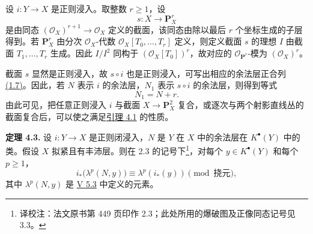 设 \(i:Y\to X\) 是正则浸入。取整数 \(r\ge1\)，设
\[
  s:X\longrightarrow \mathbf P_X^r
\]
是由同态 \((\mathcal O_X)^{r+1}\to\mathcal O_X\) 定义的截面，该同态由除以最后 \(r\) 个坐标生成的子层得到。若 \(\mathbf P_X^r\) 由分次 \(\mathcal O_X\)-代数 \(\mathcal O_X[T_0,\ldots,T_r]\) 定义，则定义截面 \(s\) 的理想 \(I\) 由截面 \(T_1,\ldots,T_r\) 生成。因此 \(I/I^2\) 同构于 \((\mathcal O_X[T_0])^r\)，故对应的 \(\mathcal O_{\mathbf P^r}\)-模为 \((\mathcal O_X)^r\)。

截面 \(s\) 显然是正则浸入，故 \(s\circ i\) 也是正则浸入，可写出相应的余法层正合列 \hyperlink{sga6.e07.prop.1-7}{(1.7)}。因此，若 \(N\) 表示 \(i\) 的余法层，\(N_1\) 表示 \(s\circ i\) 的余法层，则得到等式
\[
  N_1=N+r.
\]
由此可见，把任意正则浸入 \(i\) 与截面 \(X\to\mathbf P_X^2\) 复合，或逐次与两个射影直线丛的截面复合后，可以使之满足\hyperlink{sga6.e07.lem.4-1}{引理 4.1} 的性质。

\textbf{定理 4.3.} 设 \(i:Y\to X\) 是正则闭浸入，\(N\) 是 \(Y\) 在 \(X\) 中的余法层在 \(K^\bullet(Y)\) 中的类。假设 \(X\) 拟紧且有丰沛层。则在 2.3 的记号下\footnote{译校注：法文原书第 449 页印作 2.3；此处所用的爆破图及正像同态记号见 3.3。}，对每个 \(y\in K^\bullet(Y)\) 和每个 \(p\ge1\)，
\begin{equation}\tag{4.3.1}
 i_*\bigl(\lambda^p(N,y)\bigr)\equiv \lambda^p(i_*(y))
  \pmod{\text{挠元}},
\end{equation}
其中 \(\lambda^p(N,y)\) 是 \hyperlink{sga6.e05.def.5-3}{V 5.3} 中定义的元素。

